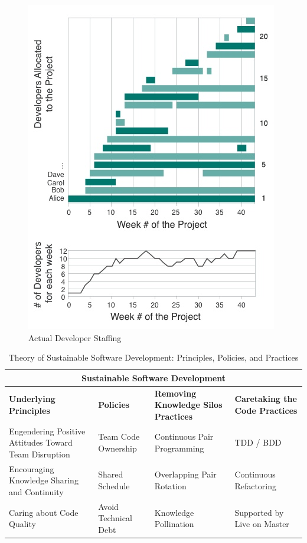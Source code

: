\begin{figure}[t]
\centering
\includegraphics[width=\oneColumnWidth{}]{sustainable_software_development_images/DeveloperStaffingV7.jpg}
\caption{Actual Developer Staffing}
\label{DeveloperStaffing}
\end{figure}

\begin{table}[t]
\renewcommand{\arraystretch}{1.5}
\centering
\caption{Theory of Sustainable Software Development: Principles, Policies, and Practices}
\label{SustainableSoftwareDevelopmentTable}
\begin{tabular}{|p{1.75in}|p{1.30in}|p{1.75in}|p{1.6in}|}
\hline
\multicolumn{4}{|c|}{\textbf{Sustainable Software Development}} \\
\hline
\textbf{Underlying Principles} & \textbf{Policies} & \textbf{Removing Knowledge Silos Practices} & \textbf{Caretaking the Code Practices} \\
\hline
Engendering Positive Attitudes Toward Team Disruption & Team Code Ownership & Continuous Pair Programming & TDD / BDD \\
Encouraging Knowledge Sharing and Continuity & Shared Schedule & Overlapping Pair Rotation & Continuous Refactoring \\
Caring about Code Quality & Avoid Technical Debt & Knowledge Pollination & Supported by Live on Master \\ 
\hline
\end{tabular}
\end{table}


